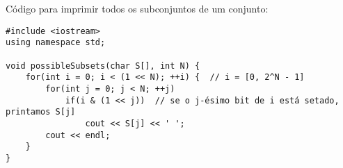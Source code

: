 \documentclass{article}
\begin{document}
Código para imprimir todos os subconjuntos de um conjunto:

\begin{verbatim}
#include <iostream>
using namespace std;

void possibleSubsets(char S[], int N) {
    for(int i = 0; i < (1 << N); ++i) {  // i = [0, 2^N - 1]
        for(int j = 0; j < N; ++j)
            if(i & (1 << j))  // se o j-ésimo bit de i está setado, printamos S[j]
                cout << S[j] << ' ';
        cout << endl;
    }
}
\end{verbatim}
\end{document}
